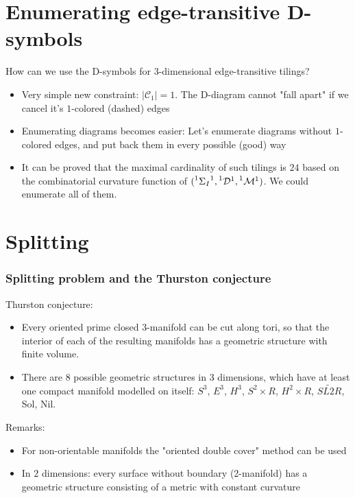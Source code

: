 \section{Enumerating edge-transitive D-symbols}
\begin{frame}
  How can we use the D-symbols for $3$-dimensional edge-transitive tilings?
  \begin{itemize}
    \item Very simple new constraint: $|\mathcal{C}_1|=1$. The
      D-diagram cannot "fall apart" if we cancel it's $1$-colored (dashed)
      edges
    \item Enumerating diagrams becomes easier: Let's enumerate diagrams without
      $1$-colored edges, and put back them in every possible (good) way
    \item It can be proved that the maximal cardinality of such tilings is $24$
      based on the combinatorial curvature function of
      $(\leftexp{1}{\Sigma_I}^1,\leftexp{1}{\mathcal{D}}^1,\leftexp{1}{\mathcal{M}}^1)$.
      We could enumerate all of them. 
  \end{itemize}
\end{frame}


\section{Splitting}

\begin{frame}
  \frametitle{Splitting problem and the Thurston conjecture}
  Thurston conjecture:
  \begin{itemize}
    \item Every oriented prime closed 3-manifold can be cut along tori, so that
      the interior of each of the resulting manifolds has a geometric structure
      with finite volume.
    \item There are 8 possible geometric structures in 3 dimensions, which have
      at least one compact manifold modelled on itself: $S^3$, $E^3$,
      $H^3$, $S^2\times R$, $H^2\times R$, $\widetilde{SL2R}$, Sol,
      Nil.
  \end{itemize}
  Remarks:
  \begin{itemize}
    \item For non-orientable manifolds the "oriented double cover" method can be
      used
    \item In $2$ dimensions: every surface without boundary (2-manifold) has a
      geometric structure consisting of a metric with constant curvature
  \end{itemize}
\end{frame}

